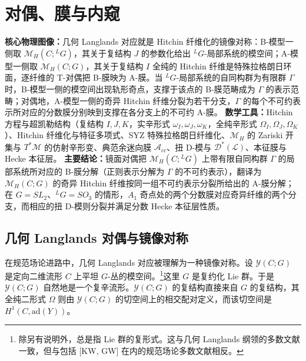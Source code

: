 

\section{对偶、膜与内窥}

\begin{keytakeaway}
\textbf{核心物理图像：}几何 Langlands 对应就是 Hitchin 纤维化的镜像对称：B-模型一侧取 $\mathcal{M}_H(C;{}^{L}G)$，其关于复结构 $J$ 的参数化给出 ${}^{L}G$-局部系统的模空间；A-模型一侧取 $\mathcal{M}_H(C;G)$，其关于复结构 $I$ 全纯的 Hitchin 纤维是特殊拉格朗日环面，逐纤维的 T-对偶把 B-膜映为 A-膜。当 ${}^{L}G$-局部系统的自同构群为有限群 $\Gamma$ 时，B-模型一侧的模空间出现轨形奇点，支撑于该点的 B-膜范畴成为 $\Gamma$ 的表示范畴；对偶地，A-模型一侧的奇异 Hitchin 纤维分裂为若干分支，$\Gamma$ 的每个不可约表示所对应的分数膜分别映到支撑在各分支上的不可约 A-膜。
\textbf{数学工具：}Hitchin 方程与超凯勒结构（复结构 $I,J,K$，实辛形式 $\omega_I,\omega_J,\omega_K$，全纯辛形式 $\Omega_I,\Omega_J,\Omega_K$）、Hitchin 纤维化与特征多项式、SYZ 特殊拉格朗日纤维化、$\mathcal{M}_H$ 的 Zariski 开集与 $T^*\mathcal{M}$ 的仿射辛形变、典范余迷向膜 $\mathcal{A}_{cc}$、扭 D-模与 $\mathcal{D}^*(\mathcal{L})$、本征膜与 Hecke 本征层。
\textbf{主要结论：}镜面对偶把 $\mathcal{M}_H(C;{}^{L}G)$ 上带有限自同构群 $\Gamma$ 的局部系统所对应的 B-膜分解（正则表示分解为 $\Gamma$ 的不可约表示），翻译为 $\mathcal{M}_H(C;G)$ 的奇异 Hitchin 纤维按同一组不可约表示分裂所给出的 A-膜分解；在 $G=SL_2$、${}^{L}G=SO_3$ 的情形，$A_1$ 奇点处的两个分数膜对应奇异纤维的两个分支，而相应的扭 D-模则分裂并满足分数 Hecke 本征层性质。
\end{keytakeaway}

\subsection{几何 Langlands 对偶与镜像对称}

在规范场论进路中，几何 Langlands 对应被理解为一种镜像对称。设 $\mathcal{Y}(C;G)$ 是定向二维流形 $C$ 上平坦 $G$-丛的模空间。\footnote{除另有说明外，总是指 Lie 群的复形式。这与几何 Langlands 纲领的多数文献一致，但与包括 [KW, GW] 在内的规范场论多数文献相反。}这里 $G$ 是复约化 Lie 群。于是 $\mathcal{Y}(C;G)$ 自然地是一个复辛流形。$\mathcal{Y}(C;G)$ 的复结构直接来自 $G$ 的复结构，其全纯二形式 $\Omega$ 则由 $\mathcal{Y}(C;G)$ 的切空间上的相交配对定义，而该切空间是 $H^1(C,\mathrm{ad}(Y))$。

